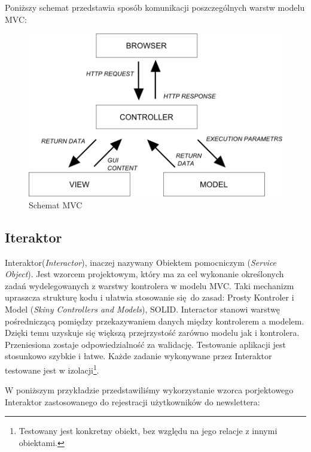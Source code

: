     Poniższy schemat przedstawia sposób komunikacji poszczególnych warstw modelu MVC:
    \begin{figure}[h]
      \centering
      \includegraphics[scale=0.87]{images/mvc_model.png}
      \caption{Schemat MVC}
    \end{figure}
  \clearpage
  \subsection{Iteraktor}
  Interaktor\cite{interactors}(\emph{Interactor}), inaczej nazywany Obiektem pomocniczym (\emph{Service Object}).
  Jest wzorcem projektowym, który ma za cel wykonanie określonych zadań wydelegowanych z warstwy kontrolera w modelu MVC. Taki mechanizm upraszcza strukturę kodu i ułatwia stosowanie się do zasad: Prosty Kontroler i Model (\emph{Skiny Controllers and Models}), SOLID.
  Interactor stanowi warstwę pośredniczącą pomiędzy przekazywaniem danych między kontrolerem a modelem.
  Dzięki temu uzyskuje się większą przejrzystość zarówno modelu jak i kontrolera. Przeniesiona zostaje odpowiedzialność za walidację. Testowanie aplikacji jest stosunkowo szybkie i łatwe. Każde zadanie wykonywane przez Interaktor testowane jest w izolacji\footnote{Testowany jest konkretny obiekt, bez względu na jego relacje z innymi obiektami.}.

  W poniższym przykładzie przedstawiliśmy wykorzystanie wzorca porjektowego Interaktor zastosowanego do rejestracji użytkowników do newslettera:\\
  
